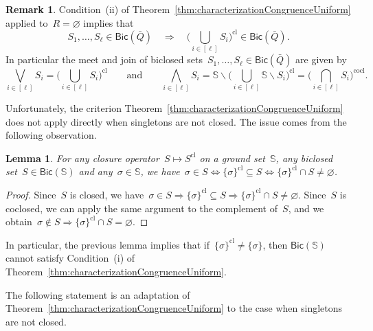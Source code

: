 \documentclass{amsart}
\newtheorem{lemma}[theorem]{Lemma}
\theoremstyle{definition}
\newtheorem{remark}[theorem]{Remark}
\newcommand{\cS}{\mathbb{S}} %
\newcommand{\ssm}{\smallsetminus} %
\newcommand{\bigMeet}{\bigwedge} %
\newcommand{\bigJoin}{\bigvee} %
\newcommand{\closure}[1]{#1^{\mathrm{cl}}} %
\newcommand{\coclosure}[1]{#1^{\mathrm{cocl}}} %
\newcommand{\Bicl}[1]{\mathsf{Bic}(#1)} %
\begin{document}
\begin{remark}
\label{rem:meetJoinBiclosedSets}
Condition~(ii) of Theorem~\ref{thm:characterizationCongruenceUniform} applied to~$R = \varnothing$ implies that
\[
S_1, \dots, S_\ell \in \Bicl{\bar Q} \quad \Longrightarrow \quad \closure{\Big( \bigcup_{i \in [\ell]} S_i \Big)} \in \Bicl{\bar Q}.
\]
In particular the meet and join of biclosed sets~$S_1, \dots, S_\ell \in \Bicl{\bar Q}$ are given by
\[
\bigJoin_{i \in [\ell]} S_i = \closure{\Big( \bigcup_{i \in [\ell]} S_i \Big)}
\qquad\text{and}\qquad
\bigMeet_{i \in [\ell]} S_i = \cS \ssm \closure{\Big( \bigcup_{i \in [\ell]} \cS \ssm S_i \Big)} = \coclosure{\Big( \bigcap_{i \in [\ell]} S_i \Big)}.
\]
\end{remark}

\medskip
Unfortunately, the criterion Theorem~\ref{thm:characterizationCongruenceUniform} does not apply directly when singletons are not closed.
The issue comes from the following observation.

\begin{lemma}
\label{lem:loops}
For any closure operator~$S \mapsto \closure{S}$ on a ground set~$\cS$, any biclosed set~$S \in \Bicl{\cS}$ and any~$\sigma \in \cS$, we have~$\sigma \in S \iff \closure{\{\sigma\}} \subseteq S \iff \closure{\{\sigma\}} \cap S \ne \varnothing$.
\end{lemma}

\begin{proof}
Since~$S$ is closed, we have~$\sigma \in S \Longrightarrow \closure{\{\sigma\}} \subseteq S \Longrightarrow \closure{\{\sigma\}} \cap S \ne \varnothing$.
Since~$S$ is coclosed, we can apply the same argument to the complement of~$S$, and we obtain~$\sigma \notin S \Longrightarrow \closure{\{\sigma\}} \cap S = \varnothing$.
\end{proof}

In particular, the previous lemma implies that if~$\closure{\{\sigma\}} \ne \{\sigma\}$, then $\Bicl{\cS}$ cannot satisfy Condition~(i) of Theorem~\ref{thm:characterizationCongruenceUniform}.

The following statement is an adaptation of Theorem~\ref{thm:characterizationCongruenceUniform} to the case when singletons are not closed.
\end{document}
